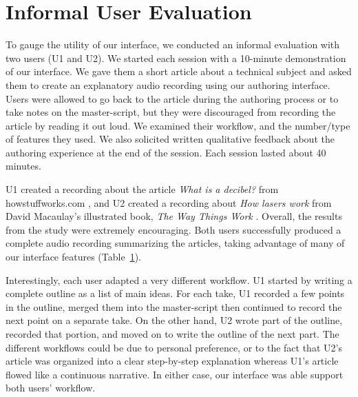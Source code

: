 \section{Informal User Evaluation}

\begin{table*}[ht]
\center
{}
\label{Tab:TiltTest}
\end{table*}
To gauge the utility of our interface, we conducted an informal evaluation with two users (U1 and U2). We started each session with a 10-minute demonstration of our interface. We gave them a short article about a technical subject and asked them to create an explanatory audio recording using our authoring interface. Users were allowed to go back to the article during the authoring process or to take notes on the master-script, but they were discouraged from recording the article by reading it out loud. We examined their workflow, and the number/type of features they used. We also solicited written qualitative feedback about the authoring experience at the end of the session. Each session lasted about 40 minutes.

U1 created a recording about the article \textit{What is a decibel? } from howstuffworks.com \cite{howstuffworks}, and U2 created a recording about \textit{How lasers work} from David Macaulay's illustrated book, \textit{The Way Things Work} \cite{macaulay1999way}. Overall, the results from the study were extremely encouraging. Both users successfully produced a complete audio recording summarizing the articles, taking advantage of many of our interface features (Table~\ref{}). 



Interestingly, each user adapted a very different workflow. U1 started by writing a complete outline as a list of main ideas. For each take, U1 recorded a few points in the outline, merged them into the master-script then continued to record the next point on a separate take. On the other hand, U2 wrote part of the outline, recorded that portion, and moved on to write the outline of the next part. The different workflows could be due to personal preference, or  to the fact that U2's article was organized into a clear step-by-step explanation whereas U1's article flowed like a continuous narrative. In either case, our interface was able support both users' workflow. 

